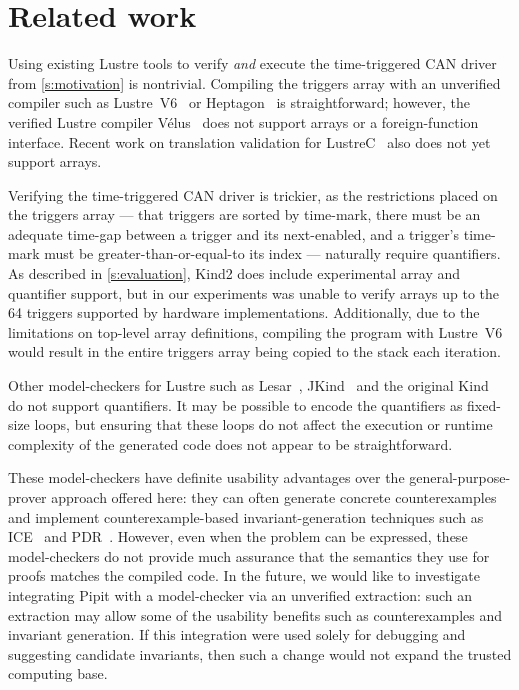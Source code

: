 
\section{Related work}
\label{s:related-work}


Using existing Lustre tools to verify \emph{and} execute the time-triggered CAN driver from \autoref{s:motivation} is nontrivial.
Compiling the triggers array with an unverified compiler such as Lustre~V6~\cite{jahier2016lustre} or Heptagon~\cite{gerard2012modular} is straightforward; however, the verified Lustre compiler Vélus~\cite{bourke2023verified} does not support arrays or a foreign-function interface.
Recent work on translation validation for LustreC~\cite{brun2023equation} also does not yet support arrays.

Verifying the time-triggered CAN driver is trickier, as the restrictions placed on the triggers array --- that triggers are sorted by time-mark, there must be an adequate time-gap between a trigger and its next-enabled, and a trigger's time-mark must be greater-than-or-equal-to its index --- naturally require quantifiers.
As described in \autoref{s:evaluation}, Kind2 does include experimental array and quantifier support, but in our experiments was unable to verify arrays up to the 64 triggers supported by hardware implementations.
Additionally, due to the limitations on top-level array definitions, compiling the program with Lustre~V6 would result in the entire triggers array being copied to the stack each iteration.

Other model-checkers for Lustre such as Lesar~\cite{raymond2008synchronous}, JKind~\cite{gacek2018jkind} and the original Kind~\cite{hagen2008scaling} do not support quantifiers.
It may be possible to encode the quantifiers as fixed-size loops, but ensuring that these loops do not affect the execution or runtime complexity of the generated code does not appear to be straightforward.

These model-checkers have definite usability advantages over the general-purpose-prover approach offered here: they can often generate concrete counterexamples and implement counterexample-based invariant-generation techniques such as ICE~\cite{garg2014ice} and PDR~\cite{bradley2011sat,een2011efficient}.
However, even when the problem can be expressed, these model-checkers do not provide much assurance that the semantics they use for proofs matches the compiled code.
In the future, we would like to investigate integrating Pipit with a model-checker via an unverified extraction: such an extraction may allow some of the usability benefits such as counterexamples and invariant generation.
If this integration were used solely for debugging and suggesting candidate invariants, then such a change would not expand the trusted computing base.

